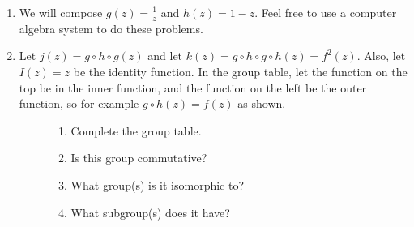 \documentclass[../textbook.tex]{subfiles}
\begin{document}
\begin{enumerate}
\setcounter{enumi}{\value{problem_i}}
\item We will compose $g(z)=\frac{1}{z}$ and $h(z)=1-z$. Feel free to use a computer algebra system to do these problems.
\begin{enumerate}
\end{enumerate}
\item Let $j(z)=g\circ h\circ g(z)$ and let $k(z)=g\circ h\circ g\circ h(z)=f^2(z)$. Also, let $I(z)=z$ be the identity function. In the group table, let the function on the top be in the inner function, and the function on the left be the outer function, so for example $g\circ h(z)=f(z)$ as shown.
\begin{figure}[h]
	\begin{center}
		\begin{minipage}[c]{0.55\textwidth}
			\begin{enumerate}
				\item Complete the group table.
				\item Is this group commutative?
				\item What group(s) is it isomorphic to?
				\item What subgroup(s) does it have?
			\end{enumerate}
		\end{minipage}
		\hfill
		\begin{minipage}[c]{0.35\textwidth}

\end{minipage}
\end{center}
\end{figure}
\end{enumerate}
\end{document}
